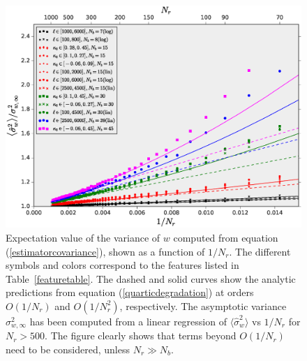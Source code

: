 \documentclass[reprint,aps,prd,superscriptaddress,showkeys,showpacs]{revtex4-1}
\newcommand{\h}[1]{\hat{#1}}
\begin{document}
\begin{figure}
\includegraphics[scale=0.3]{Figures/curving_nb.eps}
\caption{Expectation value of the variance of $w$ computed from
  equation (\ref{estimatorcovariance}), shown as a function of
  $1/N_r$. The different symbols and colors correspond to the features
  listed in Table~\ref{featuretable}.
  The dashed and solid curves show the analytic predictions from
  equation (\ref{quarticdegradation}) at orders $O(1/N_r)$ and
  $O(1/N_r^2)$, respectively. The asymptotic variance
  $\sigma^2_{w,\infty}$ has been computed from a linear regression of
  $\langle\h{\sigma}^2_w\rangle$ vs $1/N_r$ for $N_r>500$. The figure
  clearly shows that terms beyond $O(1/N_r)$ need to be considered,
  unless $N_r\gg N_b$.}
\label{curvingnb}
\end{figure}
\end{document}
